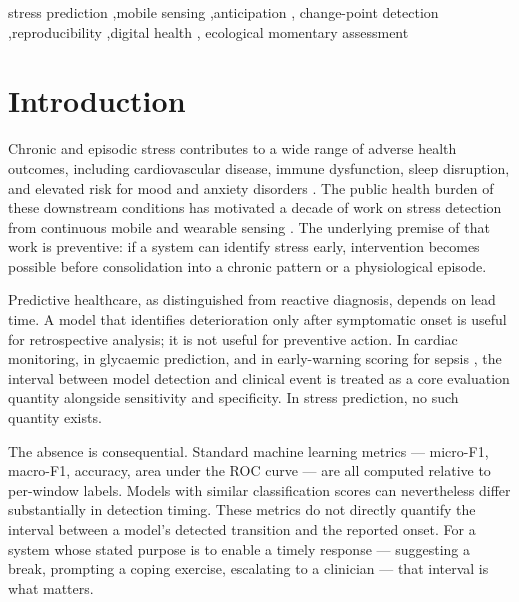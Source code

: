 \documentclass[preprint,12pt,authoryear]{elsarticle}
\begin{document}
\begin{frontmatter}
\begin{keyword}
stress prediction \sep mobile sensing \sep anticipation \sep
change-point detection \sep reproducibility \sep digital health \sep
ecological momentary assessment
\end{keyword}

\end{frontmatter}

\section{Introduction}

Chronic and episodic stress contributes to a wide range of adverse health
outcomes, including cardiovascular disease, immune dysfunction, sleep
disruption, and elevated risk for mood and anxiety disorders
\citep{cohen1983,mcewen2007,chrousos2009}. The public health burden of
these downstream conditions has motivated a decade of work on stress
detection from continuous mobile and wearable sensing
\citep{wang2014,schmidt2018,sano2013,gjoreski2016}. The underlying
premise of that work is preventive: if a system can identify stress
early, intervention becomes possible before consolidation into a chronic
pattern or a physiological episode.

Predictive healthcare, as distinguished from reactive diagnosis, depends
on lead time. A model that identifies deterioration only after
symptomatic onset is useful for retrospective analysis; it is not useful
for preventive action. In cardiac monitoring, in glycaemic prediction,
and in early-warning scoring for sepsis
\citep{ebrahimzadeh2018,debois2022,henry2015,goldstein2017}, the interval between model
detection and clinical event is treated as a core evaluation quantity
alongside sensitivity and specificity. In stress prediction, no such
quantity exists.

The absence is consequential. Standard machine learning metrics ---
micro-F1, macro-F1, accuracy, area under the ROC curve --- are all
computed relative to per-window labels. Models with similar
classification scores can nevertheless differ substantially in
detection timing. These metrics do not directly quantify the interval
between a model's detected transition and the reported onset. For a
system whose stated purpose is to enable a timely response ---
suggesting a break, prompting a coping exercise, escalating to a
clinician --- that interval is what matters.
\end{document}
